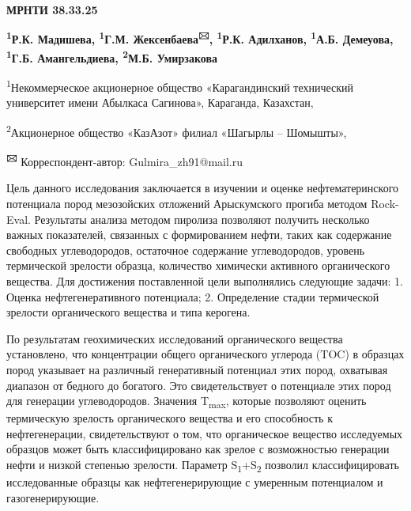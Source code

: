 \newpage
{\bfseries МРНТИ 38.33.25}


\begin{center}
{\bfseries \textsuperscript{1}Р.К. Мадишева, \textsuperscript{1}Г.М. Жексенбаева\textsuperscript{🖂}, \textsuperscript{1}Р.К. Адилханов, \textsuperscript{1}А.Б. Демеуова, \textsuperscript{1}Г.Б. Амангельдиева, \textsuperscript{2}М.Б. Умирзакова}

\textsuperscript{1}Некоммерческое акционерное общество «Карагандинский
технический университет имени Абылкаса Сагинова», Караганда, Казахстан,

\textsuperscript{2}Акционерное общество «КазАзот» филиал «Шагырлы --
Шомышты»,

{\bfseries \textsuperscript{🖂}} Корреспондент-автор: Gulmira\_zh91@mail.ru
\end{center}

Цель данного исследования заключается в изучении и оценке
нефтематеринского потенциала пород мезозойских отложений Арыскумского
прогиба методом Rock-Eval. Результаты анализа методом пиролиза позволяют
получить несколько важных показателей, связанных с формированием нефти,
таких как содержание свободных углеводородов, остаточное содержание
углеводородов, уровень термической зрелости образца, количество
химически активного органического вещества. Для достижения поставленной
цели выполнялись следующие задачи: 1. Оценка нефтегенеративного
потенциала; 2. Определение стадии термической зрелости органического
вещества и типа керогена.

По результатам геохимических исследований органического вещества
установлено, что концентрации общего органического углерода (TOC) в
образцах пород указывает на различный генеративный потенциал этих пород,
охватывая диапазон от бедного до богатого. Это свидетельствует о
потенциале этих пород для генерации углеводородов. Значения
T\textsubscript{max}, которые позволяют оценить термическую зрелость
органического вещества и его способность к нефтегенерации,
свидетельствуют о том, что органическое вещество исследуемых образцов
может быть классифицировано как зрелое с возможностью генерации нефти и
низкой степенью зрелости. Параметр S\textsubscript{1}+S\textsubscript{2}
позволил классифицировать исследованные образцы как нефтегенерирующие с
умеренным потенциалом и газогенерирующие.

